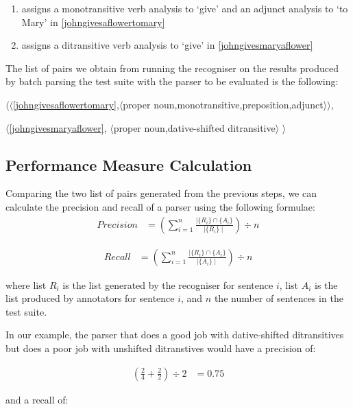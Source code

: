 \documentclass[11pt]{article}
\def\<{$\langle$}
\def\>{$\rangle$}
\begin{document}
\begin{enumerate}
\item assigns a monotransitive verb analysis to `give' and an adjunct analysis to `to Mary' in \ref{johngivesaflowertomary}

\item assigns a ditransitive verb analysis to `give' in  \ref{johngivesmaryaflower} 
\end{enumerate}


The list of pairs we obtain from running the recogniser on the results produced by batch parsing the test suite with the parser to be evaluated is the following:

\smallskip

\<\<\ref{johngivesaflowertomary},\<{\smaller proper noun,monotransitive,preposition,adjunct}\>\>, 

\hspace{1.5mm}\<\ref{johngivesmaryaflower}, \<{\smaller proper noun,dative-shifted ditransitive}\> \>

\subsection{Performance Measure Calculation}

Comparing the two list of pairs generated from the previous steps, we can calculate the precision and recall of a parser using the following formulae:
\begin{align}
          Precision &= (\sum_{i=1}^n \frac{\mid\{R_{i}\}\cap\{A_{i}\}}{\mid\{R_{i}\}\mid})\div n
\end{align}

\begin{align}
          Recall &= (\sum_{i=1}^n \frac{\mid\{R_{i}\}\cap\{A_{i}\}}{\mid\{A_{i}\}\mid})\div n
\end{align}

\noindent where list $R_i$  is the list generated by the recogniser for sentence $i$, list $A_{i}$ is the list produced by annotators for sentence $i$, and $n$ the number of sentences in the test suite.

In our example, the parser that does a good job with dative-shifted ditransitives but does a poor job with unshifted ditranstives would have a precision of:

 \begin{align*}
            (\frac{2}{4} + \frac{2}{2})\div 2 &= 0.75
\end{align*}

\noindent and a recall of:
\end{document}
